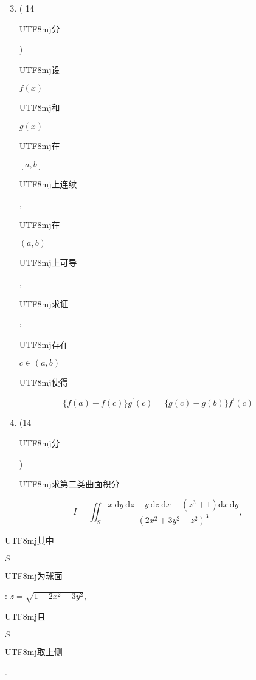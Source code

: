 \documentclass[10pt]{article}
\begin{document}
\begin{enumerate}
  \setcounter{enumi}{2}
  \item ( 14 \begin{CJK}{UTF8}{mj}分\end{CJK}) \begin{CJK}{UTF8}{mj}设\end{CJK} $f(x)$ \begin{CJK}{UTF8}{mj}和\end{CJK} $g(x)$ \begin{CJK}{UTF8}{mj}在\end{CJK} $[a, b]$ \begin{CJK}{UTF8}{mj}上连续\end{CJK}, \begin{CJK}{UTF8}{mj}在\end{CJK} $(a, b)$ \begin{CJK}{UTF8}{mj}上可导\end{CJK}, \begin{CJK}{UTF8}{mj}求证\end{CJK}: \begin{CJK}{UTF8}{mj}存在\end{CJK} $c \in(a, b)$ \begin{CJK}{UTF8}{mj}使得\end{CJK}
\end{enumerate}
$$
\{f(a)-f(c)\} g^{\prime}(c)=\{g(c)-g(b)\} f^{\prime}(c)
$$

\begin{enumerate}
  \setcounter{enumi}{3}
  \item (14 \begin{CJK}{UTF8}{mj}分\end{CJK}) \begin{CJK}{UTF8}{mj}求第二类曲面积分\end{CJK}
\end{enumerate}
$$
I=\iint_{S} \frac{x \mathrm{~d} y \mathrm{~d} z-y \mathrm{~d} z \mathrm{~d} x+\left(z^{3}+1\right) \mathrm{d} x \mathrm{~d} y}{\left(2 x^{2}+3 y^{2}+z^{2}\right)^{3}},
$$
\begin{CJK}{UTF8}{mj}其中\end{CJK} $S$ \begin{CJK}{UTF8}{mj}为球面\end{CJK}: $z=\sqrt{1-2 x^{2}-3 y^{2}}$, \begin{CJK}{UTF8}{mj}且\end{CJK} $S$ \begin{CJK}{UTF8}{mj}取上侧\end{CJK}.
\end{document}
